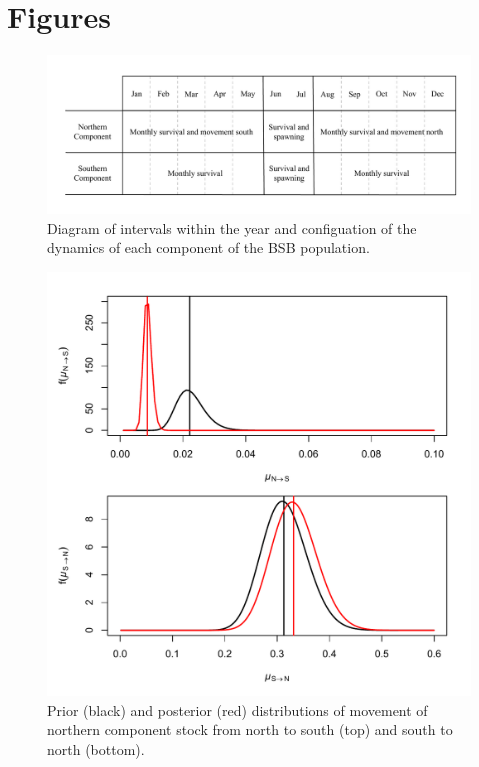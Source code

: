 \documentclass[
]{article}
\begin{document}
\pagebreak

\pagebreak

\hypertarget{figures}{%
\section*{Figures}\label{figures}}

\begin{figure}

{\centering \includegraphics[width=0.8\linewidth]{bsb_movement_diagram} 

}

\caption{Diagram of intervals within the year and configuation of the dynamics of each component of the BSB population.}\label{fig:migration-diagram}
\end{figure}
\pagebreak

\begin{figure}

{\centering \includegraphics[width=1\linewidth]{move_prior_post} 

}

\caption{Prior (black) and posterior (red) distributions of movement of northern component stock from north to south (top) and south to north (bottom).}\label{fig:move-prior-posterior}
\end{figure}
\pagebreak
\end{document}
